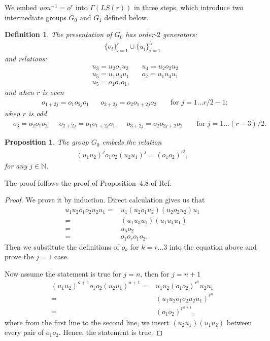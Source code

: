 \documentclass[11pt,letterpaper]{article}
\newcommand{\N}{\mathbb{N}}
\newcommand{\1}{\mathbb{1}}
\newcommand{\LS}{LS}
\newtheorem{proposition}[theorem]{Proposition}
\newtheorem{definition}[theorem]{Definition}
\theoremstyle{definition}
\begin{document}
We embed $uou^{-1}= o^r$ into $\Gamma(\LS(r))$ in three steps, which introduce two intermediate groups $G_0$ and $G_1$ defined below.
\begin{definition}	
\label{def:g0}
	The presentation of $G_0$ has order-$2$ generators:
	\begin{align*}
		\{o_i\}_{i=1}^{r} \cup \{u_i\}_{i=1}^5
	\end{align*}
	and relations:
	\begin{align*}
	&u_3 = u_2o_1u_2 && u_4 = u_2o_2u_2 \\
	&u_5 = u_1u_3u_1 && o_2 = u_1u_4u_1\\
	&u_5 = o_1 o_r o_1,
	\end{align*}
	and when $r$ is even
	\begin{align*}
	&o_{1+2j} = o_1o_{2j}o_1 && o_{2+2j} = o_2o_{1+2j}o_2&& \text{ for } j = 1 \dots r/2 - 1;
	\end{align*}
	when $r$ is odd
	\begin{align*}
	&o_3 = o_2o_1o_2 &&
	 o_{2+2j} =o_1o_{1+2j}o_1 && o_{3+2j} = o_2o_{2j+2}o_2 &&\text{ for } j = 1 \dots (r-3)/2.
	\end{align*}
\end{definition}
\begin{proposition}
	The group $G_0$ embeds the relation 
	\begin{align}
		(u_1u_2)^j o_1o_2 (u_2u_1)^j = (o_1o_2)^{r^j}, 
	\end{align}
	for any $ j \in \N$.
\end{proposition}
The proof follows the proof of Proposition~$4.8$ of Ref.~\cite{slofstra2017}
\begin{proof}
	We prove it by induction.
	Direct calculation gives us that
	\begin{align*} 
		u_1u_2 o_1o_2 u_2u_1 = &u_1 (u_2 o_1u_2) (u_2o_2 u_2) u_1 \\
	=& (u_1 u_3 u_1) (u_1 u_4 u_1)\\
	=& u_5 o_2\\
	=& o_1o_ro_1 o_2.
	\end{align*}
	Then we substitute the definitions of $o_k$ for $k = r \dots 3$ into the equation above and
	prove the $j=1$ case.
	
	Now assume the statement is true for $j = n$, then for $j = n+1$
	\begin{align*}
		(u_1u_2)^{n+1} o_1o_2 (u_2u_1)^{n+1} =& u_1u_2 (o_1o_2)^{r^n} u_2u_1 \\ 
		 =& (u_1u_2 o_1o_2 u_2u_1)^{r^n} \\
		 =& (o_1o_2)^{r^{n+1}},
	\end{align*}
	where from the first line to the second line, we insert $(u_2u_1)(u_1u_2)$ between every pair of $o_1o_2$.
	Hence, the statement is true.
\end{proof}
\end{document}
